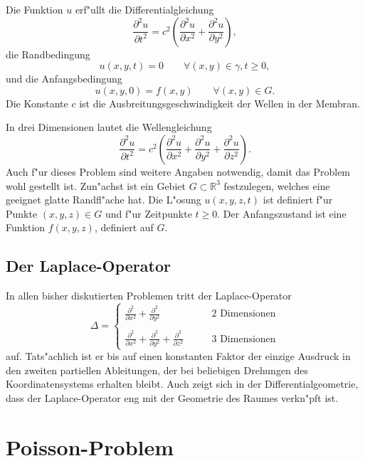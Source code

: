 Die Funktion $ u $
erf"ullt die Differentialgleichung
\[
\frac{\partial^2 u }{\partial t^2}
=c^2\left(\frac{\partial^2 u }{\partial x^2}+\frac{\partial^2 u }{\partial y^2}\right),
\]
die Randbedingung
\[
 u (x,y,t)=0\qquad \forall (x,y)\in\gamma,t\ge 0,
\]
und die Anfangsbedingung
\[
 u (x,y,0)=f(x,y)\qquad \forall (x,y)\in G.
\]
Die Konstante $c$ ist die Ausbreitungsgeschwindigkeit der Wellen in der Membran.

In drei Dimensionen lautet
die Wellengleichung 
\[
\frac{\partial^2 u }{\partial t^2}
=c^2\left(\frac{\partial^2 u }{\partial x^2}
+\frac{\partial^2 u }{\partial y^2}
+\frac{\partial^2 u }{\partial z^2}
\right).
\]
Auch f"ur dieses Problem sind weitere Angaben notwendig, damit das Problem
wohl gestellt ist.
Zun"achst ist ein Gebiet $G\subset \mathbb R^3$ festzulegen, welches
eine geeignet glatte Randfl"ache hat.
Die L"osung $ u (x,y,z,t)$ ist definiert f"ur Punkte $(x,y,z)\in G$
und f"ur Zeitpunkte $t\ge 0$.
Der Anfangszustand ist eine Funktion $f(x,y,z)$,
definiert auf $G$.

\subsection{Der Laplace-Operator\label{beispiele:laplaceoperator}}
In allen bisher diskutierten Problemen tritt der Laplace-Operator
\[
\Delta
=
\begin{cases}
\displaystyle
\frac{\partial^2}{\partial x^2}
+\frac{\partial^2}{\partial y^2}&\qquad\text{2 Dimensionen}\\
\\
\displaystyle
\frac{\partial^2}{\partial x^2}
+\frac{\partial^2}{\partial y^2}
+\frac{\partial^2}{\partial z^2}&\qquad\text{3 Dimensionen}
\end{cases}
\]
auf. Tats"achlich ist er bis auf einen konstanten Faktor der einzige Ausdruck
in den zweiten partiellen Ableitungen, der bei beliebigen Drehungen des
Koordinatensystems erhalten bleibt.
Auch zeigt sich in der Differentialgeometrie, dass der Laplace-Operator
eng mit der Geometrie des Raumes verkn"pft ist.

\section{Poisson-Problem}

